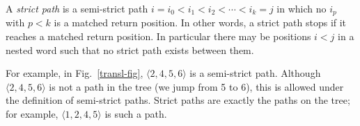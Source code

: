 \documentclass{LMCS}
\theoremstyle{plain}
\theoremstyle{definition}
\newcounter{example}
\begin{document}
A {\em strict path} is a semi-strict path $i = i_0 <
i_1 < i_2 < \cdots < i_k = j$ in which no $i_p$ with $p < k$ is a
matched return position. In other words, a strict path stops if it
reaches a matched return position. In particular there may be positions $i <
j$ in a nested word such that no strict path exists between
them.  

For example, in Fig.~\ref{transl-fig}, $\langle 2,4,5,6 \rangle$ is a
semi-strict path. Although $\langle 2,4,5,6 \rangle$ is not a path in
the tree (we jump from 5 to 6), this is allowed under the definition
of semi-strict paths. Strict paths are exactly the paths on the
tree; for example, $\langle 1,2,4,5 \rangle$ is such a path.

\begin{figure*}
\begin{center}


\end{center}
\end{figure*}
\end{document}
